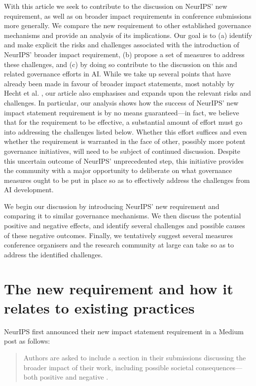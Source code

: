 \documentclass[11pt,english]{article}
\begin{document}
	With this article we seek to contribute to the discussion on NeurIPS' new requirement, as well as on broader impact requirements in conference submissions more generally. We compare the new requirement to other established governance mechanisms and provide an analysis of its implications. Our goal is to (a) identify and make explicit the risks and challenges associated with the introduction of NeurIPS' broader impact requirement, (b) propose a set of measures to address these challenges, and (c) by doing so contribute to the discussion on this and related governance efforts in AI. While we take up several points that have already been made in favour of broader impact statements, most notably by Hecht et al. \citep{hecht_its_2018}, our article also emphasises and expands upon the relevant risks and challenges. In particular, our analysis shows how the success of NeurIPS' new impact statement requirement is by no means guaranteed---in fact, we believe that for the requirement to be effective, a substantial amount of effort must go into addressing the challenges listed below. Whether this effort suffices and even whether the requirement is warranted in the face of other, possibly more potent governance initiatives, will need to be subject of continued discussion. Despite this uncertain outcome of NeurIPS' unprecedented step, this initiative provides the community with a major opportunity to deliberate on what governance measures ought to be put in place so as to effectively address the challenges from AI development. 
	
	We begin our discussion by introducing NeurIPS' new requirement and comparing it to similar governance mechanisms. We then discuss the potential positive and negative effects, and identify several challenges and possible causes of these negative outcomes. Finally, we tentatively suggest several measures conference organisers and the research community at large can take so as to address the identified challenges.
	\section*{The new requirement and how it relates to existing practices}
	NeurIPS first announced their new impact statement requirement in a Medium post as follows:
	
	\begin{quote}
		\small Authors are asked to include a section in their submissions discussing the broader impact of their work, including possible societal consequences---both positive and negative \citep{neurips_call_2020}.
	\end{quote}
	
\end{document}
